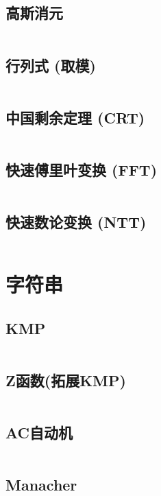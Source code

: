 \documentclass{article}
\begin{document}
\subsection{高斯消元}
\inputminted[breaklines, frame=single]{c++}{../algo/数学/高斯消元.cpp}

\subsection{行列式 (取模)}
\inputminted[breaklines, frame=single]{c++}{../algo/数学/行列式【取模】.cpp}


\subsection{中国剩余定理 (CRT)}
\inputminted[breaklines, frame=single]{c++}{../algo/数学/CRT.cpp}

\subsection{快速傅里叶变换 (FFT)}
\inputminted[breaklines, frame=single]{c++}{../algo/数学/FFT.cpp}

\subsection{快速数论变换 (NTT)}
\inputminted[breaklines, frame=single]{c++}{../algo/数学/NTT.cpp}

\section{字符串}

\subsection{KMP}
\inputminted[breaklines, frame=single]{c++}{../algo/字符串/KMP.cpp}

\subsection{Z函数(拓展KMP)}
\inputminted[breaklines, frame=single]{c++}{../algo/字符串/Z函数.cpp}


\subsection{AC自动机}
\inputminted[breaklines, frame=single]{c++}{../algo/字符串/AC自动机.cpp}


\subsection{Manacher}
\inputminted[breaklines, frame=single]{c++}{../algo/字符串/manacher.cpp}
\end{document}
